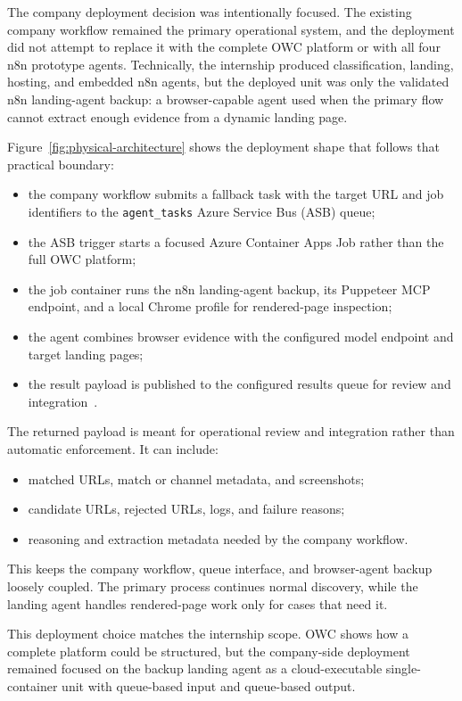 The company deployment decision was intentionally focused. The existing company
workflow remained the primary operational system, and the deployment did not attempt to
replace it with the complete OWC platform or with all four n8n prototype agents.
Technically, the internship produced classification, landing, hosting, and embedded
n8n agents, but the deployed unit was only the validated n8n landing-agent backup: a
browser-capable agent used when the primary flow cannot extract enough evidence from a
dynamic landing page.

Figure~\ref{fig:physical-architecture} shows the deployment shape that follows
that practical boundary:
\begin{itemize}
  \item the company workflow submits a fallback task with the target URL and job
  identifiers to the \texttt{agent\_tasks} Azure Service Bus (ASB) queue;
  \item the ASB trigger starts a focused Azure Container Apps Job rather than the
  full OWC platform;
  \item the job container runs the n8n landing-agent backup, its Puppeteer MCP
  endpoint, and a local Chrome profile for rendered-page inspection;
  \item the agent combines browser evidence with the configured model endpoint and
  target landing pages;
  \item the result payload is published to the configured results queue for review
  and integration~\cite{azure-jobs,azure-servicebus}.
\end{itemize}

The returned payload is meant for operational review and integration rather than
automatic enforcement. It can include:
\begin{itemize}
  \item matched URLs, match or channel metadata, and screenshots;
  \item candidate URLs, rejected URLs, logs, and failure reasons;
  \item reasoning and extraction metadata needed by the company workflow.
\end{itemize}

This keeps the company workflow, queue interface, and browser-agent backup loosely
coupled. The primary process continues normal discovery, while the landing agent
handles rendered-page work only for cases that need it.

This deployment choice matches the internship scope. OWC shows how a complete platform
could be structured, but the company-side deployment remained focused on the backup
landing agent as a cloud-executable single-container unit with queue-based input and
queue-based output.

